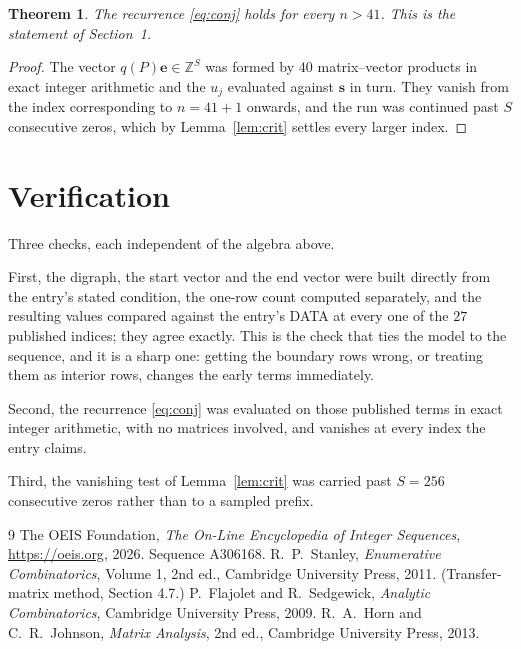 \documentclass[11pt,a4paper]{article}
\theoremstyle{plain}
\newtheorem{theorem}{Theorem}
\theoremstyle{definition}
\begin{document}
\begin{theorem}
The recurrence \eqref{eq:conj} holds for every $n>41$. This is the statement of
Section~1.
\end{theorem}

\begin{proof}
The vector $q(P)\mathbf{e}\in\mathbb{Z}^{S}$ was formed by $40$ matrix--vector
products in exact integer arithmetic and the $u_j$ evaluated against $\mathbf{s}$ in turn.
They vanish from the index corresponding to $n=41+1$ onwards, and the run was continued
past $S$ consecutive zeros, which by Lemma~\ref{lem:crit} settles every larger index.
\end{proof}

\section{Verification}

Three checks, each independent of the algebra above.

First, the digraph, the start vector and the end vector were built directly from the
entry's stated condition, the one-row count computed separately, and the resulting values
compared against the entry's DATA at every one of the $27$ published indices; they
agree exactly. This is the check that ties the model to the sequence, and it is a sharp one:
getting the boundary rows wrong, or treating them as interior rows, changes the early terms
immediately.

Second, the recurrence \eqref{eq:conj} was evaluated on those published terms in exact
integer arithmetic, with no matrices involved, and vanishes at every index the entry claims.

Third, the vanishing test of Lemma~\ref{lem:crit} was carried past $S=256$ consecutive
zeros rather than to a sampled prefix.

\begin{thebibliography}{9}
 The OEIS Foundation, \emph{The On-Line Encyclopedia of Integer
Sequences}, \url{https://oeis.org}, 2026. Sequence A306168.
 R.~P.~Stanley, \emph{Enumerative Combinatorics}, Volume 1, 2nd ed.,
Cambridge University Press, 2011. (Transfer-matrix method, Section 4.7.)
 P.~Flajolet and R.~Sedgewick, \emph{Analytic Combinatorics}, Cambridge
University Press, 2009.
 R.~A.~Horn and C.~R.~Johnson, \emph{Matrix Analysis}, 2nd ed., Cambridge
University Press, 2013.
\end{thebibliography}
\end{document}
